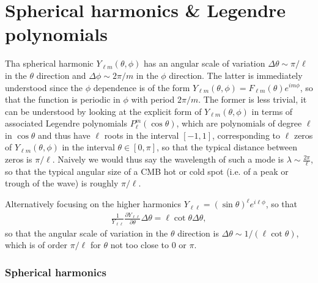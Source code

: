 \section{Spherical harmonics \& Legendre polynomials}



\begin{mytheorem}
%
Tha spherical harmonic $Y_{\ell m}(\theta, \phi)$ has an angular scale of variation $\Delta \theta \sim \pi/\ell$ in the $\theta$ direction and $\Delta \phi \sim 2\pi/m$ in the $\phi$ direction.
The latter is immediately understood since the $\phi$ dependence is of the form $Y_{\ell m}(\theta, \phi) = F_{\ell m}(\theta) e^{i m \phi}$, so that the function is periodic in $\phi$ with period $2\pi/m$.
The former is less trivial, it can be understood by looking at the explicit form of $Y_{\ell m}(\theta, \phi)$ in terms of associated Legendre polynomials $P_{\ell}^m(\cos \theta)$, which are polynomials of degree $\ell$ in $\cos \theta$ and thus have $\ell$ roots in the interval $[-1,1]$, corresponding to $\ell$ zeros of $Y_{\ell m}(\theta, \phi)$ in the interval $\theta\in[0,\pi]$, so that the typical distance between zeros is $\pi/\ell$.
Naively we would thus say the wavelength of such a mode is $\lambda \sim \tfrac{2\pi}{\ell}$, so that the typical angular size of a CMB hot or cold spot (i.e. of a peak or trough of the wave) is roughly $\pi/\ell$.

Alternatively focusing on the higher harmonics $Y_{\ell \ell}=(\sin\theta)^\ell e^{i\ell\phi}$, so that
\begin{align}
    \frac{1}{Y_{\ell\ell}}\frac{\partial Y_{\ell\ell}}{\partial \theta}\Delta\theta = \ell \cot\theta \Delta\theta,
\end{align}
so that the angular scale of variation in the $\theta$ direction is $\Delta \theta \sim 1/(\ell \cot\theta)$, which is of order $\pi/\ell$ for $\theta$ not too close to $0$ or $\pi$.
\end{mytheorem}

\subsubsection*{Spherical harmonics}

